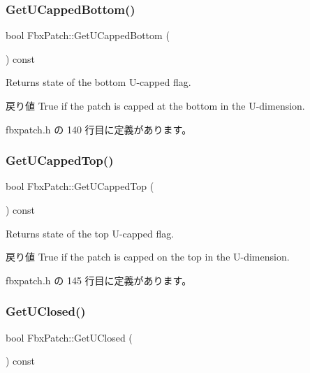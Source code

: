 \subsubsection{\texorpdfstring{Get\+U\+Capped\+Bottom()}{GetUCappedBottom()}}
{\footnotesize\ttfamily bool Fbx\+Patch\+::\+Get\+U\+Capped\+Bottom (\begin{DoxyParamCaption}{ }\end{DoxyParamCaption}) const\hspace{0.3cm}{\ttfamily [inline]}}

Returns state of the bottom U-\/capped flag. \begin{DoxyReturn}{戻り値}
{\ttfamily True} if the patch is capped at the bottom in the U-\/dimension. 
\end{DoxyReturn}


 fbxpatch.\+h の 140 行目に定義があります。

\mbox{\label{class_fbx_patch_a97f060bdd4c569854101b1a2a0750534}} 
\subsubsection{\texorpdfstring{Get\+U\+Capped\+Top()}{GetUCappedTop()}}
{\footnotesize\ttfamily bool Fbx\+Patch\+::\+Get\+U\+Capped\+Top (\begin{DoxyParamCaption}{ }\end{DoxyParamCaption}) const\hspace{0.3cm}{\ttfamily [inline]}}

Returns state of the top U-\/capped flag. \begin{DoxyReturn}{戻り値}
{\ttfamily True} if the patch is capped on the top in the U-\/dimension. 
\end{DoxyReturn}


 fbxpatch.\+h の 145 行目に定義があります。

\mbox{\label{class_fbx_patch_aa4f5d7f204475afe6cd5160e7081eeef}} 
\subsubsection{\texorpdfstring{Get\+U\+Closed()}{GetUClosed()}}
{\footnotesize\ttfamily bool Fbx\+Patch\+::\+Get\+U\+Closed (\begin{DoxyParamCaption}{ }\end{DoxyParamCaption}) const\hspace{0.3cm}{\ttfamily [inline]}}

